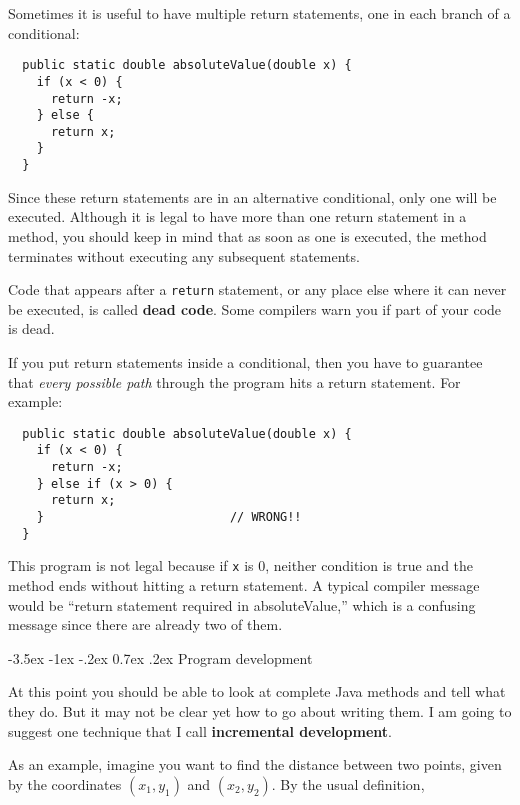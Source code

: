 \documentclass{book}
\makeatletter
\renewcommand{\section}{\@startsection 
    {section} {1} {0mm}%
    {-3.5ex \@plus -1ex \@minus -.2ex}%
    {0.7ex \@plus.2ex}%
    {\normalfont\Large\bfseries}}
\makeatother
\begin{document}
Sometimes it is useful to have multiple return
statements, one in each branch of a conditional:

\begin{verbatim}
  public static double absoluteValue(double x) {
    if (x < 0) {
      return -x;
    } else {
      return x;
    }
  }
\end{verbatim}
%
Since these return statements are in an alternative conditional,
only one will be executed.  Although it is legal to have more than one
return statement in a method, you should keep in mind
that as soon as one is executed, the method
terminates without executing any subsequent statements.

Code that appears after a {\tt return} statement, or any place else
where it can never be executed, is called {\bf dead code}.  Some
compilers warn you if part of your code is dead.


If you put return statements inside a conditional, then
you have to guarantee that {\em every possible path} through
the program hits a return statement.  For example:

\begin{verbatim}
  public static double absoluteValue(double x) {
    if (x < 0) {
      return -x;
    } else if (x > 0) {
      return x;
    }                          // WRONG!!
  }
\end{verbatim}
%
This program is not legal because if {\tt x} is 0,
neither condition is true and the method ends without hitting
a return statement.  A typical compiler message would be ``return
statement required in absoluteValue,'' which is a confusing message
since there are already two of them.


\section{Program development}
\label{distance}

At this point you should be able to look at complete Java methods
and tell what they do.  But it may not be clear yet how to go
about writing them.  I am going to suggest one technique that
I call {\bf incremental development}.


As an example, imagine you want to find the distance between
two points, given by the coordinates $(x_1, y_1)$ and
$(x_2, y_2)$.  By the usual definition,
\end{document}
